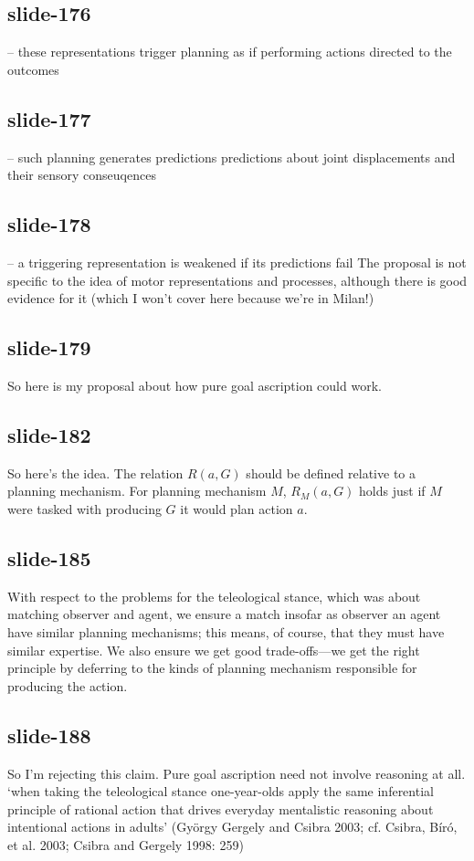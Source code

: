 \documentclass[12pt,\papersize]{extarticle}
\begin{document}
 
\subsection{slide-176}
-- these representations trigger planning as if performing actions directed to the outcomes
 
 
\subsection{slide-177}
-- such planning generates predictions
predictions about joint displacements and their sensory conseuqences
 
 
\subsection{slide-178}
-- a triggering representation is weakened if its predictions fail
The proposal is not specific to the idea of motor representations and processes, although there is good evidence for it (which I won't cover here because we're in Milan!)
 
 
\subsection{slide-179}
So here is my proposal about how pure goal ascription could work.
 
 
\subsection{slide-182}
So here's the idea. The relation $R(a,G)$ should be defined relative to a planning mechanism. For planning mechanism $M$, $R{_M}(a,G)$ holds just if $M$ were tasked with producing $G$ it would plan action $a$.
 
 
\subsection{slide-185}
With respect to the problems for the teleological stance, which was about matching observer and agent, we ensure a match insofar as observer an agent have similar planning mechanisms; this means, of course, that they must have similar expertise.
We also ensure we get good trade-offs---we get the right principle by deferring to the kinds of planning mechanism responsible for producing the action.
 
 
\subsection{slide-188}
So I'm rejecting this claim.
Pure goal ascription need not involve reasoning at all.
‘when taking the teleological stance one-year-olds apply the same inferential principle of rational action that drives everyday mentalistic reasoning about intentional actions in adults’
(György Gergely and Csibra 2003; cf. Csibra, Bíró, et al. 2003; Csibra and Gergely 1998: 259)
 
\end{document}
